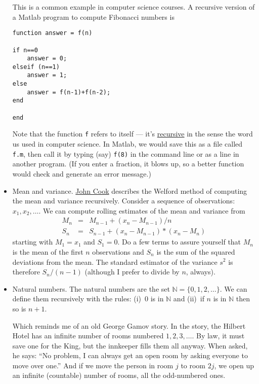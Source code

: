 \documentclass[11pt]{article}
\begin{document}
\begin{itemize}
This is a common example in computer science courses.
A recursive version of a Matlab program to compute Fibonacci numbers is
\begin{verbatim}
function answer = f(n)

if n==0
    answer = 0;
elseif (n==1)
    answer = 1;
else
    answer = f(n-1)+f(n-2);
end

end
\end{verbatim}
Note that the function {\tt f} refers to itself --- it's
\href{http://en.wikipedia.org/wiki/Recursion_(computer_science)}{recursive}
in the sense the word us used in computer science.
In Matlab, we would save this as a file called {\tt f.m}, then
call it by typing (say) {\tt f(8)} in the command line or as a line in another program.
(If you enter a fraction, it blows up, so a better function
would check and generate an error message.)

\item Mean and variance.
\href{http://www.johndcook.com/standard_deviation.html}{John Cook}
describes the Welford method of computing the mean and variance recursively.
Consider a sequence of observations:  $ x_1, x_2, \ldots $.
We can compute rolling estimates of the mean and variance from
\begin{eqnarray*}
    M_n &=& M_{n-1} + (x_n - M_{n-1}) / n \\
    S_n &=& S_{n-1} + (x_n - M_{n-1})*(x_n - M_n)
\end{eqnarray*}
starting with $ M_1= x_1$ and $S_1 = 0$.
Do a few terms to assure yourself that $M_n$ is the mean of the first $n$ observations
and $S_n$ is the sum of the squared deviations from the mean.
The standard estimator of the variance $s^2$ is therefore $ S_n/(n-1)$
(although I prefer to divide by $n$, always).

\item Natural numbers.
The natural numbers are the set $ \mathbb{N} = \{0,1,2,\ldots \} $.
We can  define them recursively with the rules: (i)~0 is in $\mathbb{N}$
and (ii)~if $n$ is in $\mathbb{N}$ then so is $n+1$.

Which reminds me of an old George Gamov story.
In the story, the Hilbert Hotel has an infinite number of rooms numbered $1, 2, 3, \ldots $.
By law, it must save one for the King, but the innkeeper fills them all anyway.
When asked, he says:  ``No problem, I can always get an open room by
asking everyone to move over one.''
And if we move the person in room $j$ to room $2j$,
we open up an infinite (countable) number of rooms, all the odd-numbered ones.
\end{itemize}
\end{document}
